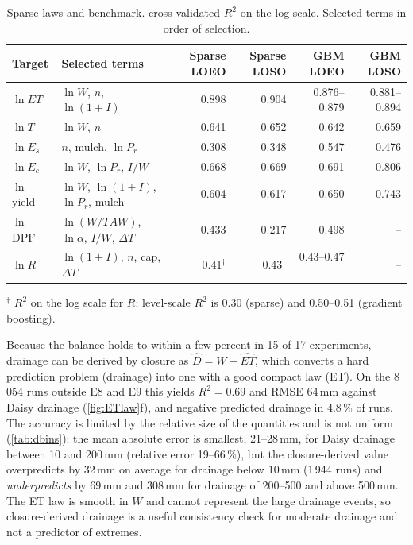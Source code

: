 \documentclass[preprint,12pt,authoryear]{elsarticle}
\newcommand{\TAW}{\mathit{TAW}}
\begin{document}
\begin{table}[H]\centering\small
\caption{Sparse laws and benchmark. cross-validated $R^2$ on the log scale. Selected terms in order of selection.}
\label{tab:laws}
\footnotesize\setlength{\tabcolsep}{4pt}
\begin{tabular}{llrrrr}
\toprule
Target & Selected terms & Sparse LOEO & Sparse LOSO & GBM LOEO & GBM LOSO\\\midrule
$\ln\mathit{ET}$ & $\ln W$, $n$, $\ln(1+I)$ & 0.898 & 0.904 & 0.876--0.879 & 0.881--0.894\\
$\ln T$ & $\ln W$, $n$ & 0.641 & 0.652 & 0.642 & 0.659\\
$\ln E_s$ & $n$, mulch, $\ln P_r$ & 0.308 & 0.348 & 0.547 & 0.476\\
$\ln E_c$ & $\ln W$, $\ln P_r$, $I/W$ & 0.668 & 0.669 & 0.691 & 0.806\\
$\ln$ yield & $\ln W$, $\ln(1+I)$, $\ln P_r$, mulch & 0.604 & 0.617 & 0.650 & 0.743\\
$\ln$ DPF & $\ln(W/\TAW)$, $\ln\alpha$, $I/W$, $\Delta T$ & 0.433 & 0.217 & 0.498 & --\\
$\ln R$ & $\ln(1+I)$, $n$, cap, $\Delta T$ & 0.41$^{\dagger}$ & 0.43$^{\dagger}$ & 0.43--0.47$^{\dagger}$ & --\\\bottomrule
\end{tabular}

\smallskip\noindent\footnotesize$^{\dagger}$ $R^2$ on the log scale for $R$; level-scale $R^2$ is 0.30 (sparse) and 0.50--0.51 (gradient boosting).
\end{table}

Because the balance holds to within a few percent in 15 of 17 experiments, drainage can be derived by closure as $\hat D=W-\widehat{\mathit{ET}}$, which converts a hard prediction problem (drainage) into one with a good compact law (ET). On the 8\,054 runs outside E8 and E9 this yields $R^2=0.69$ and RMSE 64\,mm against Daisy drainage (\cref{fig:ETlaw}f), and negative predicted drainage in 4.8\,\% of runs. The accuracy is limited by the relative size of the quantities and is not uniform (\cref{tab:dbins}): the mean absolute error is smallest, 21--28\,mm, for Daisy drainage between 10 and 200\,mm (relative error 19--66\,\%), but the closure-derived value overpredicts by 32\,mm on average for drainage below 10\,mm (1\,944 runs) and \emph{underpredicts} by 69\,mm and 308\,mm for drainage of 200--500 and above 500\,mm. The ET law is smooth in $W$ and cannot represent the large drainage events, so closure-derived drainage is a useful consistency check for moderate drainage and not a predictor of extremes.
\end{document}
